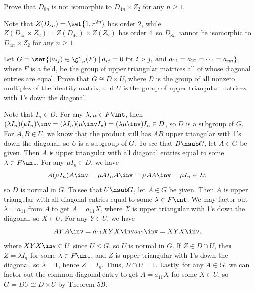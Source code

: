\begin{exercise}\label{ex5.4.13}
    Prove that $D_{8n}$ is not isomorphic to $D_{4n} \times Z_2$ for any $n \geq 1$.
\end{exercise}

\begin{sol}
    Note that $Z(D_{8n}) = \set{1, r^{2n}}$ has order 2, while $Z(D_{4n} \times Z_2) = Z(D_{4n}) \times Z(Z_2)$ has order 4, so $D_{8n}$ cannot be isomorphic to $D_{4n} \times Z_2$ for any $n \geq 1$.
\end{sol}

\begin{exercise}\label{ex5.4.14}
    Let $G = \set{(a_{ij}) \in \gl_n(F) \mid a_{ij} = 0 \text{ for } i > j, \text{ and } a_{11} = a_{22} = \cdots = a_{nn}}$, where $F$ is a field, be the group of upper triangular matrices all of whose diagonal entries are equal. Prove that $G \cong D \times U$, where $D$ is the group of all nonzero multiples of the identity matrix, and $U$ is the group of upper triangular matrices with 1's down the diagonal.
\end{exercise}

\begin{sol}
    Note that $I_n \in D$. For any $\lambda, \mu \in F\unt$, then $(\lambda I_n)(\mu I_n)\inv = (\lambda I_n)(\mu\inv I_n) = (\lambda\mu\inv)I_n \in D$, so $D$ is a subgroup of $G$. For $A, B \in U$, we know that the product still has $AB$ upper triangular with 1's down the diagonal, so $U$ is a subgroup of $G$. To see that $D \nsub G$, let $A \in G$ be given. Then $A$ is upper triangular with all diagonal entries equal to some $\lambda \in F\unt$. For any $\mu I_n \in D$, we have
    \[A(\mu I_n)A\inv = \mu AI_n A\inv = \mu A A\inv = \mu I_n \in D,\]
    so $D$ is normal in $G$. To see that $U \nsub G$, let $A \in G$ be given. Then $A$ is upper triangular with all diagonal entries equal to some $\lambda \in F\unt$. We may factor out $\lambda = a_{11}$ from $A$ to get $A = a_{11} X$, where $X$ is upper triangular with 1's down the diagonal, so $X \in U$. For any $Y \in U$, we have
    \[A Y A\inv = a_{11} X Y X\inv a_{11}\inv = X Y X\inv,\]
    where $XYX \inv \in U$ since $U \leq G$, so $U$ is normal in $G$. If $Z \in D \cap U$, then $Z = \lambda I_n$ for some $\lambda \in F\unt$, and $Z$ is upper triangular with 1's down the diagonal, so $\lambda = 1$, hence $Z = I_n$. Thus, $D \cap U = 1$. Lastly, for any $A \in G$, we can factor out the common diagonal entry to get $A = a_{11} X$ for some $X \in U$, so $G = DU \cong D \times U$ by Theorem 5.9.
\end{sol}

